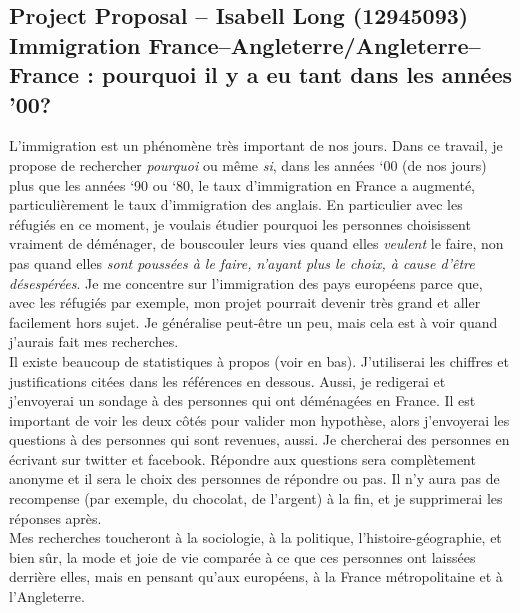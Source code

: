 \documentclass[12pt]{article}
\begin{document}
\begin{center}
	\section*{Project Proposal -- Isabell Long (12945093)\\
	    			Immigration France--Angleterre\slash Angleterre--France :
						pourquoi il y a eu tant dans les années '00?}
\end{center}

L'immigration est un phénomène très important de nos jours. Dans ce
travail, je propose de rechercher \textit{pourquoi} ou même
\textit{si}, dans les années `00 (de nos jours) plus que les années
`90 ou `80, le taux d'immigration en France a augmenté,
particulièrement le taux d'immigration des anglais. En particulier
avec les réfugiés en ce moment, je voulais étudier pourquoi les
personnes choisissent vraiment de déménager, de bouscouler leurs vies
quand elles \textit{veulent} le faire, non pas quand elles
\textit{sont poussées à le faire, n'ayant plus le choix, à cause
d'être désespérées}. Je me concentre sur l'immigration des pays
européens parce que, avec les réfugiés par exemple, mon projet
pourrait devenir très grand et aller facilement hors sujet. Je
généralise peut-être un peu, mais cela est à voir quand j'aurais fait
mes recherches.\\

\noindent Il existe beaucoup de statistiques à propos (voir en bas).
J'utiliserai les chiffres et justifications citées dans
les références en dessous. Aussi, je redigerai et j'envoyerai un
sondage à des personnes qui ont déménagées en France. Il est important
de voir les deux côtés pour valider mon hypothèse, alors j'envoyerai
les questions à des personnes qui sont revenues, aussi. Je chercherai
des personnes en écrivant sur twitter et facebook. Répondre aux
questions sera complètement anonyme et il sera le choix des personnes
de répondre ou pas. Il n'y aura pas de recompense (par exemple, du
chocolat, de l'argent) à la fin, et je supprimerai les réponses après.\\

\noindent Mes recherches toucheront à la sociologie, à la politique,
l'histoire-géographie, et bien sûr, la mode et joie de vie comparée à
ce que ces personnes ont laissées derrière elles, mais en pensant
qu'aux européens, à la France métropolitaine et à l'Angleterre.

\nocite{europa-migration-statistics,oecd,ined,govuk,immigration-1986,
				sayad2004suffering,original-questionnaire}



\end{document}
